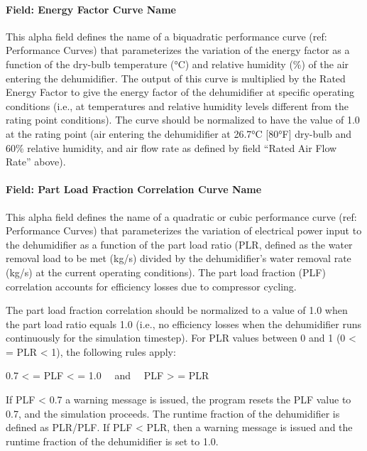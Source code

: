 \paragraph{Field: Energy Factor Curve Name}\label{field-energy-factor-curve-name}

This alpha field defines the name of a biquadratic performance curve (ref: Performance Curves) that parameterizes the variation of the energy factor as a function of the dry-bulb temperature (°C) and relative humidity (\%) of the air entering the dehumidifier. The output of this curve is multiplied by the Rated Energy Factor to give the energy factor of the dehumidifier at specific operating conditions (i.e., at temperatures and relative humidity levels different from the rating point conditions). The curve should be normalized to have the value of 1.0 at the rating point (air entering the dehumidifier at 26.7°C {[}80°F{]} dry-bulb and 60\% relative humidity, and air flow rate as defined by field ``Rated Air Flow Rate'' above).

\paragraph{Field: Part Load Fraction Correlation Curve Name}\label{field-part-load-fraction-correlation-curve-name-000}

This alpha field defines the name of a quadratic or cubic performance curve (ref: Performance Curves) that parameterizes the variation of electrical power input to the dehumidifier as a function of the part load ratio (PLR, defined as the water removal load to be met (kg/s) divided by the dehumidifier's water removal rate (kg/s) at the current operating conditions). The part load fraction (PLF) correlation accounts for efficiency losses due to compressor cycling.

The part load fraction correlation should be normalized to a value of 1.0 when the part load ratio equals 1.0 (i.e., no efficiency losses when the dehumidifier runs continuously for the simulation timestep). For PLR values between 0 and 1 (0 \textless{} = PLR \textless{} 1), the following rules apply:

0.7 \textless{} = PLF \textless{} = 1.0~~ and~~ PLF \textgreater{} = PLR

If PLF \textless{} 0.7 a warning message is issued, the program resets the PLF value to 0.7, and the simulation proceeds. The runtime fraction of the dehumidifier is defined as PLR/PLF. If PLF \textless{} PLR, then a warning message is issued and the runtime fraction of the dehumidifier is set to 1.0.

